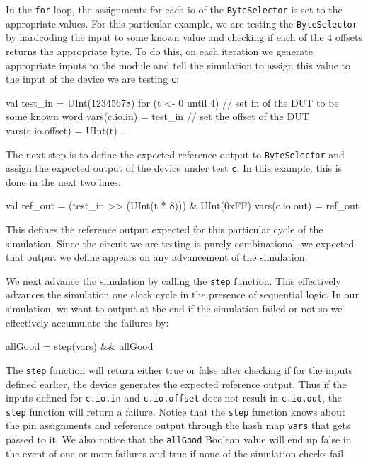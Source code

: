 In the \verb+for+ loop, the assignments for each io of the \verb+ByteSelector+ is set to the appropriate values. For this particular example, we are testing the \verb+ByteSelector+ by hardcoding the input to some known value and checking if each of the 4 offsets returns the appropriate byte. To do this, on each iteration we generate appropriate inputs to the module and tell the simulation to assign this value to the input of the device we are testing \verb+c+:

\begin{scala}
val test_in = UInt(12345678)
for (t <- 0 until 4) {
  // set in of the DUT to be some known word
  vars(c.io.in) = test_in  
  // set the offset of the DUT
  vars(c.io.offset) = UInt(t) 
  ..
}
\end{scala}

The next step is to define the expected reference output to \verb+ByteSelector+ and assign the expected output of the device under test \verb+c+. In this example, this is done in the next two lines:

\begin{scala}
val ref_out = (test_in >> (UInt(t * 8))) & UInt(0xFF)
vars(c.io.out) = ref_out
\end{scala}

This defines the reference output expected for this particular cycle of the simulation. Since the circuit we are testing is purely combinational, we expected that output we define appears on any advancement of the simulation.

We next advance the simulation by calling the \verb+step+ function. This effectively advances the simulation one clock cycle in the presence of sequential logic. In our simulation, we want to output at the end if the simulation failed or not so we effectively accumulate the failures by:

\begin{scala}
allGood = step(vars) && allGood
\end{scala}

The \verb+step+ function will return either true or false after checking if for the inputs defined earlier, the device generates the expected reference output. Thus if the inputs defined for \verb+c.io.in+ and \verb+c.io.offset+ does not result in \verb+c.io.out+, the \verb+step+ function will return a failure. Notice that the \verb+step+ function knows about the pin assignments and reference output through the hash map \verb+vars+ that gets passed to it. We also notice that the \verb+allGood+ Boolean value will end up false in the event of one or more failures and true if none of the simulation checks fail.

